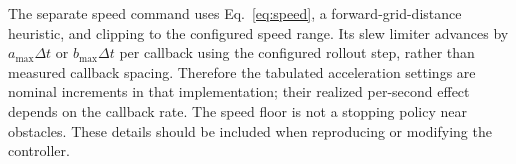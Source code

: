 The separate speed command uses Eq.~\ref{eq:speed}, a forward-grid-distance heuristic, and clipping to the configured speed range. Its slew limiter advances by $a_{\max}\Delta t$ or $b_{\max}\Delta t$ per callback using the configured rollout step, rather than measured callback spacing. Therefore the tabulated acceleration settings are nominal increments in that implementation; their realized per-second effect depends on the callback rate. The speed floor is not a stopping policy near obstacles. These details should be included when reproducing or modifying the controller.
